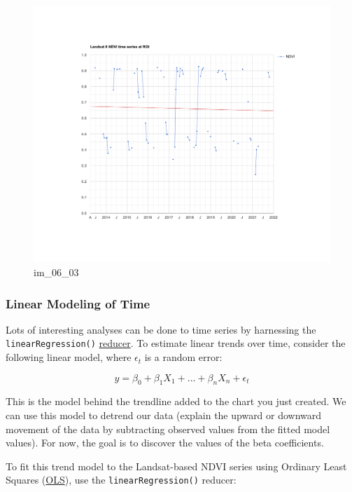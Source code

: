 \documentclass[
]{article}
\begin{document}
\begin{figure}
\centering
\includegraphics{./im/im_06_03.png}
\caption{im\_06\_03}
\end{figure}

\hypertarget{linear-modeling-of-time}{%
\subsubsection{Linear Modeling of Time}\label{linear-modeling-of-time}}

Lots of interesting analyses can be done to time series by harnessing the \texttt{linearRegression()} \href{https://developers.google.com/earth-engine/api_docs\#eereducerlinearregression}{reducer}. To estimate linear trends over time, consider the following linear model, where \(\epsilon_t\) is a random error:

\[ y = \beta_0 + \beta_1X_1 + ... + \beta_nX_n + \epsilon_t \]

This is the model behind the trendline added to the chart you just created. We can use this model to detrend our data (explain the upward or downward movement of the data by subtracting observed values from the fitted model values). For now, the goal is to discover the values of the beta coefficients.

To fit this trend model to the Landsat-based NDVI series using Ordinary Least Squares (\href{https://statisticsbyjim.com/glossary/ordinary-least-squares/}{OLS}), use the \texttt{linearRegression()} reducer:
\end{document}

